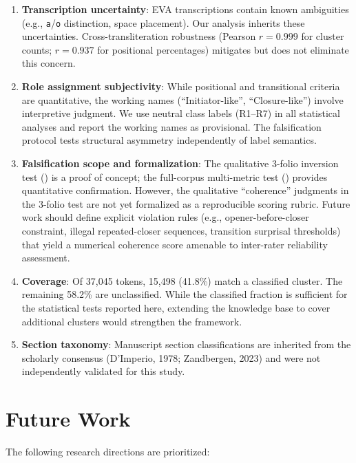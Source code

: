 \documentclass[11pt,a4paper,twocolumn]{article}
\begin{document}
\begin{enumerate}[leftmargin=*,itemsep=2pt]
    \item \textbf{Transcription uncertainty}: EVA transcriptions contain known ambiguities (e.g., \texttt{a}/\texttt{o} distinction, space placement). Our analysis inherits these uncertainties. Cross-transliteration robustness (Pearson $r=0.999$ for cluster counts; $r=0.937$ for positional percentages) mitigates but does not eliminate this concern.
    \item \textbf{Role assignment subjectivity}: While positional and transitional criteria are quantitative, the working names (``Initiator-like'', ``Closure-like'') involve interpretive judgment. We use neutral class labels (R1--R7) in all statistical analyses and report the working names as provisional. The falsification protocol tests structural asymmetry independently of label semantics.
    \item \textbf{Falsification scope and formalization}: The qualitative 3-folio inversion test () is a proof of concept; the full-corpus multi-metric test () provides quantitative confirmation. However, the qualitative ``coherence'' judgments in the 3-folio test are not yet formalized as a reproducible scoring rubric. Future work should define explicit violation rules (e.g., opener-before-closer constraint, illegal repeated-closer sequences, transition surprisal thresholds) that yield a numerical coherence score amenable to inter-rater reliability assessment.
    \item \textbf{Coverage}: Of 37,045 tokens, 15,498 (41.8\%) match a classified cluster. The remaining 58.2\% are unclassified. While the classified fraction is sufficient for the statistical tests reported here, extending the knowledge base to cover additional clusters would strengthen the framework.
    \item \textbf{Section taxonomy}: Manuscript section classifications are inherited from the scholarly consensus (D'Imperio, 1978; Zandbergen, 2023) and were not independently validated for this study.
\end{enumerate}

\section{Future Work}
\label{sec:future}

The following research directions are prioritized:
\end{document}
